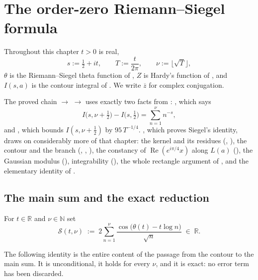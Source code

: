 %

\chapter{The order-zero Riemann--Siegel formula}
\label{cha:rs_zero}

Throughout this chapter $t>0$ is real,
\[
  s:=\tfrac12+it,\qquad T:=\frac{t}{2\pi},\qquad \nu:=\lfloor\sqrt T\rfloor ,
\]
$\theta$ is the Riemann--Siegel theta function of , $Z$ is Hardy's
function of , and $I(s,a)$ is the contour integral of
.  We write $\overline{z}$ for complex conjugation.

The proved chain  $\to$  $\to$
 uses exactly two facts from :
, which says
\[
  I\bigl(s,\nu+\tfrac12\bigr)-I\bigl(s,\tfrac12\bigr)=\sum_{n=1}^{\nu}n^{-s},
\]
and , which bounds $I(s,\nu+\tfrac12)$ by $95\,T^{-1/4}$.
, which proves Siegel's identity, draws on considerably more of
that chapter: the kernel and its residues (,
), the contour and the branch (,
, ), the constancy of
$\operatorname{Re}(e^{i\pi/4}x)$ along $L(a)$ (), the Gaussian modulus
(), integrability (), the whole rectangle
argument of , and the elementary identity of .

\section{The main sum and the exact reduction}
\label{sec:rsz_reduction}

\begin{definition}
\label{def:rsz_main_sum}
\leanok
{}
For $t\in\mathbb{R}$ and $\nu\in\mathbb{N}$ set
\[
  \mathcal{S}(t,\nu)\;:=\;2\sum_{n=1}^{\nu}\frac{\cos\bigl(\theta(t)-t\log n\bigr)}{\sqrt n}
  \;\in\;\mathbb{R}.
\]
\end{definition}

The following identity is the entire content of the passage from the contour to the main
sum.  It is unconditional, it holds for every $\nu$, and it is exact: no error term has
been discarded.

